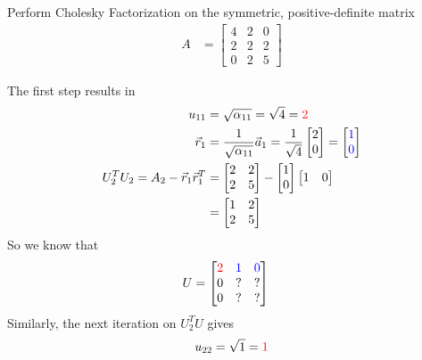 \begin{exmp}
\label{exmp:Cholesky}
Perform Cholesky Factorization on the symmetric, positive-definite matrix
\begin{align*}
A &=
\begin{bmatrix}
4 & 2 & 0 \\
2 & 2 & 2 \\
0 & 2 & 5 
\end{bmatrix}
\end{align*}
\end{exmp}
\begin{solution}
The first step results in
\begin{align*}
u_{11} &= \sqrt{\alpha_{11}} = \sqrt{4} = \textcolor{red}{2} \\
\vec{r}_1 &= \frac{1}{\sqrt{\alpha_{11}}}\vec{a}_{1} = \frac{1}{\sqrt{4}}
\begin{bmatrix}
2 \\
0
\end{bmatrix}
= 
\begin{bmatrix}
\textcolor{blue}{1} \\
\textcolor{blue}{0}
\end{bmatrix} \\
U_2^T U_2 = A_2 - \vec{r}_1\vec{r}_1^T &= 
\begin{bmatrix}
2 & 2 \\
2 & 5
\end{bmatrix}
-
\begin{bmatrix}
1 \\
0
\end{bmatrix}
\begin{bmatrix}
1 & 0
\end{bmatrix} \\
&= \begin{bmatrix}
1 & 2 \\
2 & 5 
\end{bmatrix}
\end{align*}
So we know that
\begin{align*}
U &=
\begin{bmatrix}
\textcolor{red}{2} & \textcolor{blue}{1} & \textcolor{blue}{0} \\
0 & ? & ? \\
0 & ? & ? \\
\end{bmatrix}
\end{align*}
Similarly, the next iteration on $U_2^T U$ gives
\begin{align*}
u_{22} &= \sqrt{1} = \textcolor{red}{1} \\  

\end{align*}
\end{solution}
